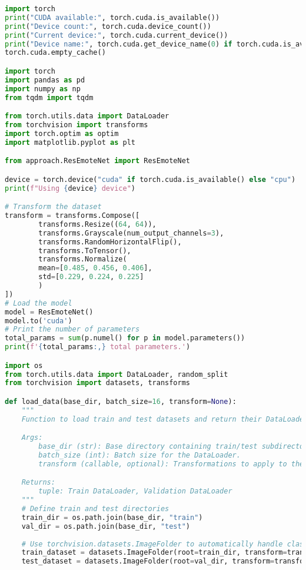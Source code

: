 \begin{lstlisting}[language=Python, caption={Python skript použitý na trenovanie modelu}, label={lst:training}]
% Obsah Jupyter notebooku
import torch
print("CUDA available:", torch.cuda.is_available())
print("Device count:", torch.cuda.device_count())
print("Current device:", torch.cuda.current_device())
print("Device name:", torch.cuda.get_device_name(0) if torch.cuda.is_available() else "None")
torch.cuda.empty_cache()

import torch
import pandas as pd
import numpy as np
from tqdm import tqdm

from torch.utils.data import DataLoader
from torchvision import transforms
import torch.optim as optim
import matplotlib.pyplot as plt

from approach.ResEmoteNet import ResEmoteNet

device = torch.device("cuda" if torch.cuda.is_available() else "cpu")
print(f"Using {device} device")

# Transform the dataset
transform = transforms.Compose([
        transforms.Resize((64, 64)),
        transforms.Grayscale(num_output_channels=3),
        transforms.RandomHorizontalFlip(),
        transforms.ToTensor(),
        transforms.Normalize(
        mean=[0.485, 0.456, 0.406],
        std=[0.229, 0.224, 0.225]
        )
])
# Load the model
model = ResEmoteNet()
model.to('cuda')
# Print the number of parameters
total_params = sum(p.numel() for p in model.parameters())
print(f'{total_params:,} total parameters.')

import os
from torch.utils.data import DataLoader, random_split
from torchvision import datasets, transforms

def load_data(base_dir, batch_size=16, transform=None):
    """
    Function to load train and test datasets and return their DataLoaders.

    Args:
        base_dir (str): Base directory containing train/test subdirectories.
        batch_size (int): Batch size for the DataLoader.
        transform (callable, optional): Transformations to apply to the images.

    Returns:
        tuple: Train DataLoader, Validation DataLoader
    """
    # Define train and test directories
    train_dir = os.path.join(base_dir, "train")
    val_dir = os.path.join(base_dir, "test")
    
    # Use torchvision.datasets.ImageFolder to automatically handle class folders
    train_dataset = datasets.ImageFolder(root=train_dir, transform=transform)
    test_dataset = datasets.ImageFolder(root=val_dir, transform=transform)
    

\end{lstlisting}

